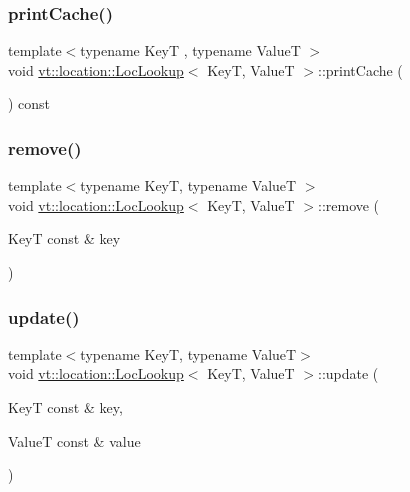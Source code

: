\subsubsection{\texorpdfstring{print\+Cache()}{printCache()}}
{\footnotesize\ttfamily template$<$typename KeyT , typename ValueT $>$ \\
void \hyperlink{structvt_1_1location_1_1_loc_lookup}{vt\+::location\+::\+Loc\+Lookup}$<$ KeyT, ValueT $>$\+::print\+Cache (\begin{DoxyParamCaption}{ }\end{DoxyParamCaption}) const}

\mbox{\label{structvt_1_1location_1_1_loc_lookup_a6c82de648f51e3242bd7430d185041fe}} 
\subsubsection{\texorpdfstring{remove()}{remove()}}
{\footnotesize\ttfamily template$<$typename KeyT, typename ValueT $>$ \\
void \hyperlink{structvt_1_1location_1_1_loc_lookup}{vt\+::location\+::\+Loc\+Lookup}$<$ KeyT, ValueT $>$\+::remove (\begin{DoxyParamCaption}\item[{KeyT const \&}]{key }\end{DoxyParamCaption})}

\mbox{\label{structvt_1_1location_1_1_loc_lookup_a95e6e8096c0d9c5a76727ebbf441995a}} 
\subsubsection{\texorpdfstring{update()}{update()}}
{\footnotesize\ttfamily template$<$typename KeyT, typename ValueT$>$ \\
void \hyperlink{structvt_1_1location_1_1_loc_lookup}{vt\+::location\+::\+Loc\+Lookup}$<$ KeyT, ValueT $>$\+::update (\begin{DoxyParamCaption}\item[{KeyT const \&}]{key,  }\item[{ValueT const \&}]{value }\end{DoxyParamCaption})}



